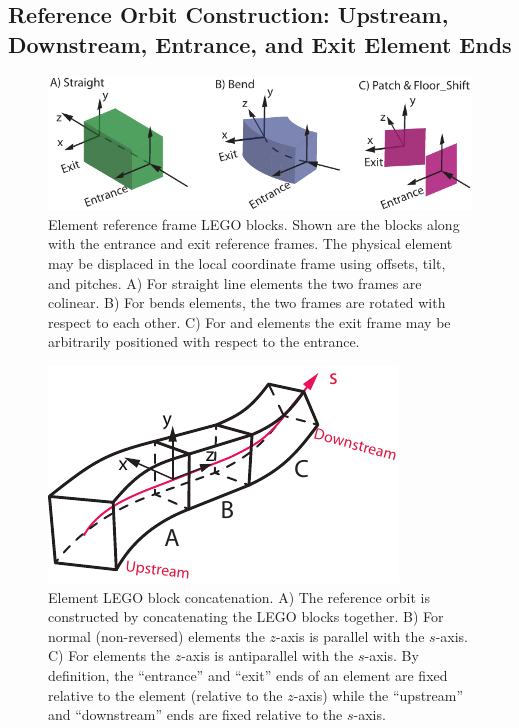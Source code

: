 \subsection{Reference Orbit Construction: Upstream, Downstream, Entrance, and Exit Element Ends}
\label{s:ref.construct}


  \begin{figure}[tb]
  \centering
  \includegraphics{element-coord-frame.pdf}
\caption[Element LEGO blocks.]{Element reference frame LEGO blocks. Shown are the blocks along with
the entrance and exit reference frames. The physical element may be displaced in the local
coordinate frame using offsets, tilt, and pitches. A) For straight line elements the two frames are
colinear. B) For bends elements, the two frames are rotated with respect to each other. C) For
 and  elements the exit frame may be arbitrarily positioned with respect
to the entrance.}
  \label{f:ele.coord.frame}
  \end{figure}


\begin{figure}[tb]
  \centering
  \includegraphics{element-stream.pdf}
  \caption[Element LEGO block concatenation.]{
Element LEGO block concatenation. A) The reference orbit is constructed by concatenating the LEGO
blocks together. B) For normal (non-reversed) elements the $z$-axis is parallel with the
$s$-axis. C) For  elements the $z$-axis is antiparallel with the $s$-axis. By
definition, the ``entrance'' and ``exit'' ends of an element are fixed relative to the element
(relative to the $z$-axis) while the ``upstream'' and ``downstream'' ends are fixed relative to the
$s$-axis.}
  \label{f:stream}
\end{figure}

